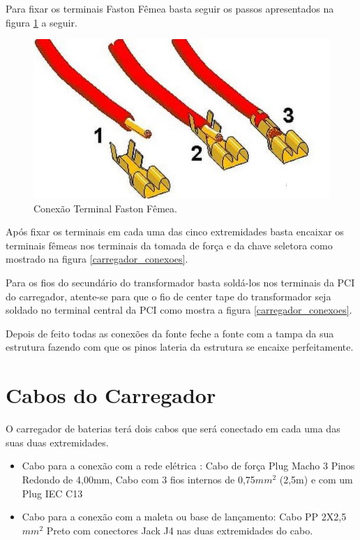 Para fixar os terminais Faston Fêmea basta seguir os passos apresentados na figura \ref{terminal_faston} a seguir.

\begin{figure}[H]
  \centering
  \includegraphics[width=\textwidth]{Figuras/Carregador/terminal_faston.JPG}
  \caption{Conexão Terminal Faston Fêmea.} 
  \label{terminal_faston}
\end{figure}

Após fixar os terminais em cada uma das cinco extremidades basta encaixar os terminais fêmeas nos terminais da tomada de força e da chave seletora como mostrado na figura \ref{carregador_conexoes}.

Para os fios do secundário do transformador basta soldá-los nos terminais da PCI do carregador, atente-se para que o fio de center tape do transformador seja soldado no terminal central da PCI como mostra a figura \ref{carregador_conexoes}.

Depois de feito todas as conexões da fonte feche a fonte com a tampa da sua estrutura fazendo com que os pinos lateria da estrutura se encaixe perfeitamente. 

\section{Cabos do Carregador}

O carregador de baterias terá dois cabos que será conectado em cada uma das suas duas extremidades.

\begin{itemize}
    \item Cabo para a conexão com a rede elétrica : Cabo de força Plug Macho 3 Pinos Redondo de 4,00mm, Cabo com 3 fios internos de 0,75$mm^2$ (2,5m) e com um Plug IEC C13 
    \item Cabo para a conexão com a maleta ou base de lançamento: Cabo PP 2X2,5$mm^2$ Preto com conectores Jack J4 nas duas extremidades do cabo.
\end{itemize}

